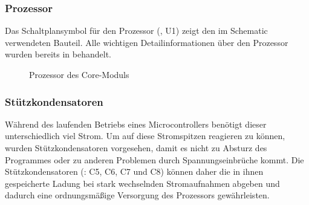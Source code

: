 \subsubsection{Prozessor}
Das Schaltplansymbol für den Prozessor (, U1) zeigt den im Schematic verwendeten Bauteil. Alle wichtigen Detailinformationen über den Prozessor wurden bereits in  behandelt.

\begin{figure}[htb]
    \centering
    \qquad
    \qquad
    \caption[Prozessor des Core-Moduls]{Prozessor des \gls{Core-Modul}s}
    \label{fig:coremodul-prozessor}
\end{figure}

\subsubsection{Stützkondensatoren}
Während des laufenden Betriebs eines Microcontrollers benötigt dieser unterschiedlich viel Strom. Um auf diese Stromspitzen reagieren zu können, wurden Stützkondensatoren vorgesehen, damit es nicht zu Absturz des Programmes oder zu anderen Problemen durch Spannungseinbrüche kommt. Die Stützkondensatoren (: C5, C6, C7 und C8) können daher die in ihnen gespeicherte Ladung bei stark wechselnden Stromaufnahmen abgeben und dadurch eine ordnungsmäßige Versorgung des Prozessors gewährleisten.

